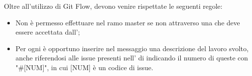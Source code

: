 Oltre all'utilizzo di Git Flow, devono venire rispettate le seguenti regole:
\begin{itemize}
	\item Non è permesso effettuare  nel ramo master se non attraverso una  che deve essere accettata dall’\Amministratore{};
	\item Per ogni  è opportuno inserire nel messaggio una descrizione del lavoro svolto, anche riferendosi alle issue presenti nell' di  indicando il numero di queste con "\#[NUM]", in cui [NUM] è un codice di issue.
\end{itemize}
